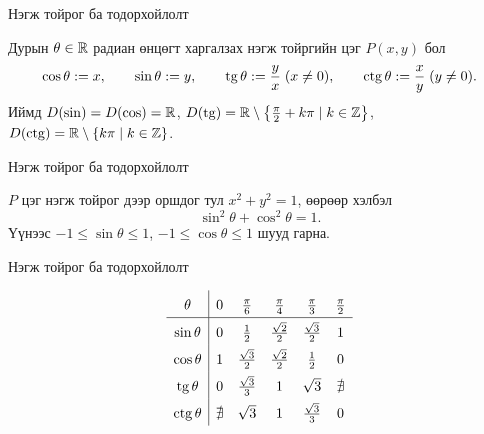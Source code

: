 \begin{frame}[allowframebreaks]{Нэгж тойрог ба тодорхойлолт}
\begin{definition}
Дурын $\theta\in\mathbb{R}$ радиан өнцөгт харгалзах нэгж тойргийн цэг $P(x,y)$ бол
\[
\cos\theta:=x,\qquad \sin\theta:=y,\qquad
\operatorname{tg}\theta:=\frac{y}{x}\;(x\neq0),\qquad \operatorname{ctg}\theta:=\frac{x}{y}\;(y\neq0).
\]
Иймд $D(\sin)=D(\cos)=\mathbb{R}$,\;
$D(\operatorname{tg})=\mathbb{R}\setminus\left\{\tfrac{\pi}{2}+k\pi\mid k\in\mathbb{Z}\right\}$,\;
$D(\operatorname{ctg})=\mathbb{R}\setminus\{k\pi\mid k\in\mathbb{Z}\}$.
\end{definition}
\end{frame}

\begin{frame}[allowframebreaks]{Нэгж тойрог ба тодорхойлолт}
\begin{remark}
$P$ цэг нэгж тойрог дээр оршдог тул $x^2+y^2=1$, өөрөөр хэлбэл
\[
\boxed{\sin^2\theta+\cos^2\theta=1.}
\]
Үүнээс $-1\le\sin\theta\le1$, $-1\le\cos\theta\le1$ шууд гарна.
\end{remark}
\end{frame}

\begin{frame}[allowframebreaks]{Нэгж тойрог ба тодорхойлолт}
\begin{example}
\[
\renewcommand{\arraystretch}{1.6}
\begin{array}{c|ccccc}
\theta & 0 & \frac{\pi}{6} & \frac{\pi}{4} & \frac{\pi}{3} & \frac{\pi}{2}\\\hline
\sin\theta & 0 & \frac12 & \frac{\sqrt2}{2} & \frac{\sqrt3}{2} & 1\\
\cos\theta & 1 & \frac{\sqrt3}{2} & \frac{\sqrt2}{2} & \frac12 & 0\\
\tg\theta & 0 & \frac{\sqrt3}{3} & 1 & \sqrt3 & \nexists\\
\ctg\theta & \nexists & \sqrt3 & 1 & \frac{\sqrt3}{3} & 0
\end{array}
\]
\end{example}
\end{frame}

